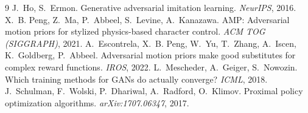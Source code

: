 \documentclass[11pt,a4paper]{article}
\begin{document}
\begin{thebibliography}{9}
 J.~Ho, S.~Ermon. Generative adversarial imitation learning.
  \emph{NeurIPS}, 2016.
 X.~B. Peng, Z.~Ma, P.~Abbeel, S.~Levine, A.~Kanazawa.
  AMP: Adversarial motion priors for stylized physics-based character control.
  \emph{ACM TOG (SIGGRAPH)}, 2021.
 A.~Escontrela, X.~B. Peng, W.~Yu, T.~Zhang, A.~Iscen,
  K.~Goldberg, P.~Abbeel. Adversarial motion priors make good substitutes for
  complex reward functions. \emph{IROS}, 2022.
 L.~Mescheder, A.~Geiger, S.~Nowozin. Which training
  methods for GANs do actually converge? \emph{ICML}, 2018.
 J.~Schulman, F.~Wolski, P.~Dhariwal, A.~Radford,
  O.~Klimov. Proximal policy optimization algorithms. \emph{arXiv:1707.06347}, 2017.
\end{thebibliography}
\end{document}
